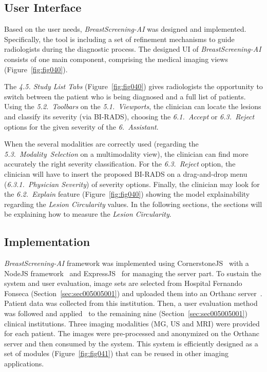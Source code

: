 \subsection{User Interface}
\label{sec:sec006004002}

Based on the user needs, {\it BreastScreening-AI} was designed and implemented.
Specifically, the tool is including a set of refinement mechanisms to guide radiologists during the diagnostic process.
The designed \ac{UI} of {\it BreastScreening-AI} consists of one main component, comprising the medical imaging views (Figure~\ref{fig:fig040}).

The {\it 4.5. Study List Tabs} (Figure~\ref{fig:fig040}) gives radiologists the opportunity to switch between the patient who is being diagnosed and a full list of patients.
Using the {\it 5.2.~Toolbars} on the {\it 5.1.~Viewports}, the clinician can locate the lesions and classify its severity (via \ac{BI-RADS}), choosing the {\it 6.1.~Accept} or {\it 6.3.~Reject} options for the given severity of the {\it 6.~Assistant}.

When the several modalities are correctly used (regarding the {\it 5.3.~Modality~Selection} on a multimodality view), the clinician can find more accurately the right severity classification.
For the {\it 6.3.~Reject} option, the clinician will have to insert the proposed \ac{BI-RADS} on a drag-and-drop menu ({\it 6.3.1.~Physician Severity}) of severity options.
Finally, the clinician may look for the {\it 6.2.~Explain} feature (Figure~\ref{fig:fig040}) showing the model explainability regarding the {\it Lesion Circularity} values.
In the following sections, the sections will be explaining how to measure the {\it Lesion Circularity}.

\subsection{Implementation}
\label{sec:sec006004003}

{\it BreastScreening-AI} framework was implemented using CornerstoneJS\footnotemark[36]~\cite{urban2017lesiontracker} with a NodeJS framework\footnotemark[37]~\cite{farrell2016nodejs, drnasin2017javascript} and ExpressJS\footnotemark[38]~\cite{gustin2017empowerment} for managing the server part.
To sustain the system and user evaluation, image sets are selected from Hospital Fernando Fonseca (Section~\ref{sec:sec005005001}) and uploaded them into an Orthanc server~\cite{Jodogne2018}.
Patient data was collected from this institution.
Then, a user evaluation method was followed and applied~\cite{https://doi.org/10.13140/rg.2.2.16566.14403/1} to the remaining nine (Section~\ref{sec:sec005005001}) clinical institutions.
Three imaging modalities (\ac{MG}, \ac{US} and \ac{MRI}) were provided for each patient.
The images were pre-processed and anonymized on the Orthanc server and then consumed by the system.
This system is efficiently designed as a set of modules (Figure~\ref{fig:fig041}) that can be reused in other imaging applications.

